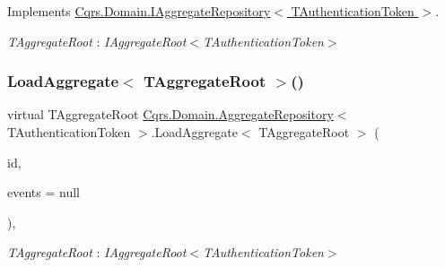 Implements \hyperlink{interfaceCqrs_1_1Domain_1_1IAggregateRepository_a890633fddbd05bd3b9e9968a2de095bb_a890633fddbd05bd3b9e9968a2de095bb}{Cqrs.\+Domain.\+I\+Aggregate\+Repository$<$ T\+Authentication\+Token $>$}.

\begin{Desc}
\item[Type Constraints]\begin{description}
\item[{\em T\+Aggregate\+Root} : {\em I\+Aggregate\+Root$<$T\+Authentication\+Token$>$}]\end{description}
\end{Desc}
\mbox{\label{classCqrs_1_1Domain_1_1AggregateRepository_a53bf020a5f2a0f697f361065b792cf61_a53bf020a5f2a0f697f361065b792cf61}} 
\subsubsection{\texorpdfstring{Load\+Aggregate$<$ T\+Aggregate\+Root $>$()}{LoadAggregate< TAggregateRoot >()}}
{\footnotesize\ttfamily virtual T\+Aggregate\+Root \hyperlink{classCqrs_1_1Domain_1_1AggregateRepository}{Cqrs.\+Domain.\+Aggregate\+Repository}$<$ T\+Authentication\+Token $>$.Load\+Aggregate$<$ T\+Aggregate\+Root $>$ (\begin{DoxyParamCaption}\item[{Guid}]{id,  }\item[{I\+List$<$ \hyperlink{interfaceCqrs_1_1Events_1_1IEvent}{I\+Event}$<$ T\+Authentication\+Token $>$$>$}]{events = {\ttfamily null} }\end{DoxyParamCaption})\hspace{0.3cm}{\ttfamily [protected]}, {\ttfamily [virtual]}}

\begin{Desc}
\item[Type Constraints]\begin{description}
\item[{\em T\+Aggregate\+Root} : {\em I\+Aggregate\+Root$<$T\+Authentication\+Token$>$}]\end{description}
\end{Desc}
\mbox{\label{classCqrs_1_1Domain_1_1AggregateRepository_af26efcb464ac989962a9ad138466e4d7_af26efcb464ac989962a9ad138466e4d7}} 

